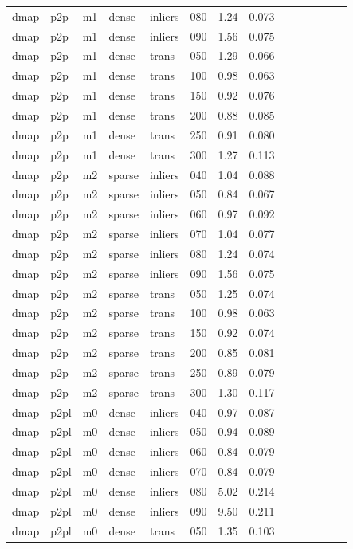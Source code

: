 \begin{table}[htbp]
\begin{tabular}{llllllrrrrrrrr}
  dmap & p2p & m1 & dense & inliers & 080 & 1.24 & 0.073 \\
  dmap & p2p & m1 & dense & inliers & 090 & 1.56 & 0.075 \\
  dmap & p2p & m1 & dense & trans & 050 & 1.29 & 0.066 \\
  dmap & p2p & m1 & dense & trans & 100 & 0.98 & 0.063 \\
  dmap & p2p & m1 & dense & trans & 150 & 0.92 & 0.076 \\
  dmap & p2p & m1 & dense & trans & 200 & 0.88 & 0.085 \\
  dmap & p2p & m1 & dense & trans & 250 & 0.91 & 0.080 \\
  dmap & p2p & m1 & dense & trans & 300 & 1.27 & 0.113 \\
  dmap & p2p & m2 & sparse & inliers & 040 & 1.04 & 0.088 \\
  dmap & p2p & m2 & sparse & inliers & 050 & 0.84 & 0.067 \\
  dmap & p2p & m2 & sparse & inliers & 060 & 0.97 & 0.092 \\
  dmap & p2p & m2 & sparse & inliers & 070 & 1.04 & 0.077 \\
  dmap & p2p & m2 & sparse & inliers & 080 & 1.24 & 0.074 \\
  dmap & p2p & m2 & sparse & inliers & 090 & 1.56 & 0.075 \\
  dmap & p2p & m2 & sparse & trans & 050 & 1.25 & 0.074 \\
  dmap & p2p & m2 & sparse & trans & 100 & 0.98 & 0.063 \\
  dmap & p2p & m2 & sparse & trans & 150 & 0.92 & 0.074 \\
  dmap & p2p & m2 & sparse & trans & 200 & 0.85 & 0.081 \\
  dmap & p2p & m2 & sparse & trans & 250 & 0.89 & 0.079 \\
  dmap & p2p & m2 & sparse & trans & 300 & 1.30 & 0.117 \\
  dmap & p2pl & m0 & dense & inliers & 040 & 0.97 & 0.087 \\
  dmap & p2pl & m0 & dense & inliers & 050 & 0.94 & 0.089 \\
  dmap & p2pl & m0 & dense & inliers & 060 & 0.84 & 0.079 \\
  dmap & p2pl & m0 & dense & inliers & 070 & 0.84 & 0.079 \\
  dmap & p2pl & m0 & dense & inliers & 080 & 5.02 & 0.214 \\
  dmap & p2pl & m0 & dense & inliers & 090 & 9.50 & 0.211 \\
  dmap & p2pl & m0 & dense & trans & 050 & 1.35 & 0.103 \\

\end{tabular}
\end{table}
